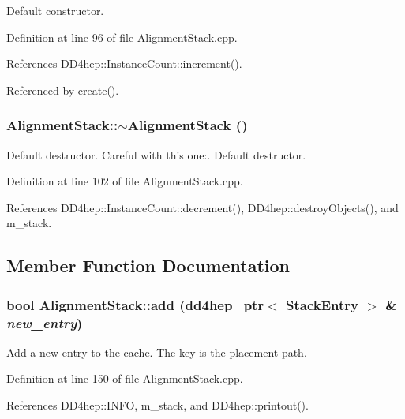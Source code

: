 Default constructor. 

Definition at line 96 of file AlignmentStack.cpp.

References DD4hep::InstanceCount::increment().

Referenced by create().\hypertarget{class_d_d4hep_1_1_alignments_1_1_alignment_stack_aaa0a50b4ba221d1591a3cdadbc06153c}{
\subsubsection[{$\sim$AlignmentStack}]{\setlength{\rightskip}{0pt plus 5cm}AlignmentStack::$\sim$AlignmentStack ()}}
\label{class_d_d4hep_1_1_alignments_1_1_alignment_stack_aaa0a50b4ba221d1591a3cdadbc06153c}


Default destructor. Careful with this one:. Default destructor. 

Definition at line 102 of file AlignmentStack.cpp.

References DD4hep::InstanceCount::decrement(), DD4hep::destroyObjects(), and m\_\-stack.

\subsection{Member Function Documentation}
\hypertarget{class_d_d4hep_1_1_alignments_1_1_alignment_stack_a16d69902ec4ebd8efe8c039d033f9e7b}{
\subsubsection[{add}]{\setlength{\rightskip}{0pt plus 5cm}bool AlignmentStack::add ({\bf dd4hep\_\-ptr}$<$ {\bf StackEntry} $>$ \& {\em new\_\-entry})}}
\label{class_d_d4hep_1_1_alignments_1_1_alignment_stack_a16d69902ec4ebd8efe8c039d033f9e7b}


Add a new entry to the cache. The key is the placement path. 

Definition at line 150 of file AlignmentStack.cpp.

References DD4hep::INFO, m\_\-stack, and DD4hep::printout().

